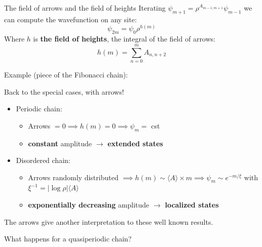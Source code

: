 \documentclass[xcolor=x11names,compress,professionalfonts]{beamer}
\renewcommand{\(}{\begin{columns}}
\renewcommand{\)}{\end{columns}}
\newcommand{\<}[1]{\begin{column}{#1}}
\renewcommand{\>}{\end{column}}
\begin{document}
\begin{frame}{The field of arrows and the field of heights}
Iterating $\psi_{m+1} = \rho^{A_{m-1,m+1}} \psi_{m-1}$ we can compute the wavefunction on any site:
\[
	\psi_{2m} = \psi_0 \rho^{h(m)}
\]
Where $h$ is \textbf{the field of heights}, the integral of the field of arrows:
\[
	h(m) = \sum_{n=0}^m A_{n, n+2}
\]

Example (piece of the Fibonacci chain):



\end{frame}

\begin{frame}{Back to the special cases, with arrows!}
\begin{itemize}
	\item Periodic chain: 
	
	\begin{itemize}
		\item Arrows $= 0 \implies h(m) = 0 \implies \psi_m = $ cst  
		\item \textbf{constant} amplitude $\rightarrow$ \textbf{extended states}
	\end{itemize}
	\item Disordered chain: 
	
	\begin{itemize}
		\item Arrows randomly distributed $\implies h(m) \sim \langle A \rangle \times m \implies \psi_m \sim e^{- m/\xi}$ with $\xi^{-1} = |\log \rho| \langle A \rangle$
		\item  \textbf{exponentially decreasing} amplitude $\rightarrow$ \textbf{localized states}
	\end{itemize}
\end{itemize}
The arrows give another interpretation to these well known results.

What happens for a quasiperiodic chain?
\end{frame}
\end{document}
